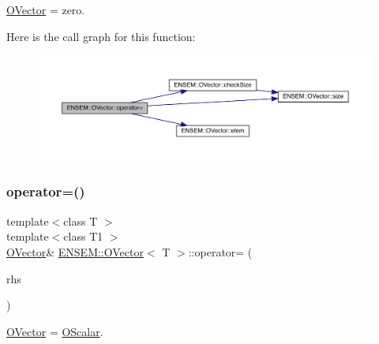 \mbox{\hyperlink{classENSEM_1_1OVector}{O\+Vector}} = zero. 

Here is the call graph for this function\+:
\nopagebreak
\begin{figure}[H]
\begin{center}
\leavevmode
\includegraphics[width=350pt]{d0/d8d/classENSEM_1_1OVector_a54123bea722ddb2b3eaea0c948735b13_cgraph}
\end{center}
\end{figure}
\mbox{\label{classENSEM_1_1OVector_a31b08dda73879d2a39c4a0bec90bc401}} 
\subsubsection{\texorpdfstring{operator=()}{operator=()}\hspace{0.1cm}{\footnotesize\ttfamily [3/8]}}
{\footnotesize\ttfamily template$<$class T $>$ \\
template$<$class T1 $>$ \\
\mbox{\hyperlink{classENSEM_1_1OVector}{O\+Vector}}\& \mbox{\hyperlink{classENSEM_1_1OVector}{E\+N\+S\+E\+M\+::\+O\+Vector}}$<$ T $>$\+::operator= (\begin{DoxyParamCaption}\item[{const \mbox{\hyperlink{classENSEM_1_1OScalar}{O\+Scalar}}$<$ T1 $>$ \&}]{rhs }\end{DoxyParamCaption})\hspace{0.3cm}{\ttfamily [inline]}}



\mbox{\hyperlink{classENSEM_1_1OVector}{O\+Vector}} = \mbox{\hyperlink{classENSEM_1_1OScalar}{O\+Scalar}}. 

